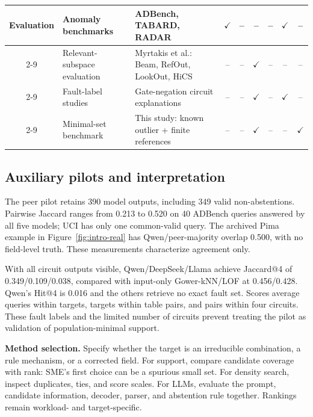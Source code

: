 \documentclass[conference]{IEEEtran}
\begin{document}
\begin{table}[t]
\begin{tabularx}{\textwidth}{|c|>{\raggedright\arraybackslash}p{1.75cm}|>{\raggedright\arraybackslash}X|c|c|c|c|c|c|}
\hline
\multirow{4}{*}{Evaluation} & Anomaly benchmarks & ADBench, TABARD, RADAR~\cite{han2022adbench,choudhury2025tabard,gu2025radar} & $\checkmark$ & -- & -- & -- & $\checkmark$ & -- \\
\cline{2-9}
 & Relevant-subspace evaluation & Myrtakis et al.: Beam, RefOut, LookOut, HiCS~\cite{myrtakis2021comparative} & -- & -- & $\checkmark$ & -- & -- & -- \\
\cline{2-9}
 & Fault-label studies & Gate-negation circuit explanations~\cite{antwarg2024groundtruth} & -- & -- & $\checkmark$ & -- & $\checkmark$ & -- \\
\cline{2-9}
 & Minimal-set benchmark & This study: known outlier + finite references & -- & -- & $\checkmark$ & -- & -- & $\checkmark$ \\
\hline
\end{tabularx}
\renewcommand{\arraystretch}{1.0}
\label{tab:related-work}
\end{table}

\subsection{Auxiliary pilots and interpretation}
The peer pilot retains 390 model outputs, including 349 valid non-abstentions. Pairwise Jaccard ranges from 0.213 to 0.520 on 40 ADBench queries answered by all five models; UCI has only one common-valid query. The archived Pima example in Figure~\ref{fig:intro-real} has Qwen/peer-majority overlap 0.500, with no field-level truth. These measurements characterize agreement only.

With all circuit outputs visible, Qwen/DeepSeek/Llama achieve Jaccard@4 of 0.349/0.109/0.038, compared with input-only Gower-kNN/LOF at 0.456/0.428. Qwen's Hit@4 is 0.016 and the others retrieve no exact fault set. Scores average queries within targets, targets within table pairs, and pairs within four circuits. These fault labels and the limited number of circuits prevent treating the pilot as validation of population-minimal support.

\textbf{Method selection.} Specify whether the target is an irreducible combination, a rule mechanism, or a corrected field. For support, compare candidate coverage with rank: SME's first choice can be a spurious small set. For density search, inspect duplicates, ties, and score scales. For LLMs, evaluate the prompt, candidate information, decoder, parser, and abstention rule together. Rankings remain workload- and target-specific.
\end{document}
